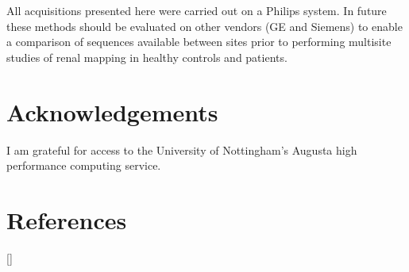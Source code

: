 All acquisitions presented here were carried out on a Philips system. In future these methods should be evaluated on other vendors (GE and Siemens) to enable a comparison of sequences available between sites prior to performing multisite studies of renal \ttwo mapping in healthy controls and patients.

\section{Acknowledgements}

I am grateful for access to the University of Nottingham's Augusta high performance computing service.

\newpage
\section{References}
[\refname]{}
\printbibliography